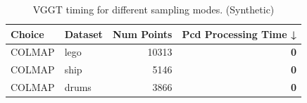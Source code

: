 \begin{table}[H]
\caption{\ifdefined\customcaption \customcaption \else VGGT timing for different sampling modes. (Synthetic) \fi}
\label{tab:01_sampling_mode_timing_synthetic}
\centering
\scriptsize
\begin{tabular}{llrr}
\toprule
Choice & Dataset & Num Points & Pcd Processing Time ↓ \\
\midrule
COLMAP & lego & 10313 & \textbf{0} \\
\midrule
COLMAP & ship & 5146 & \textbf{0} \\
\midrule
COLMAP & drums & 3866 & \textbf{0} \\
\bottomrule
\end{tabular}
\end{table}